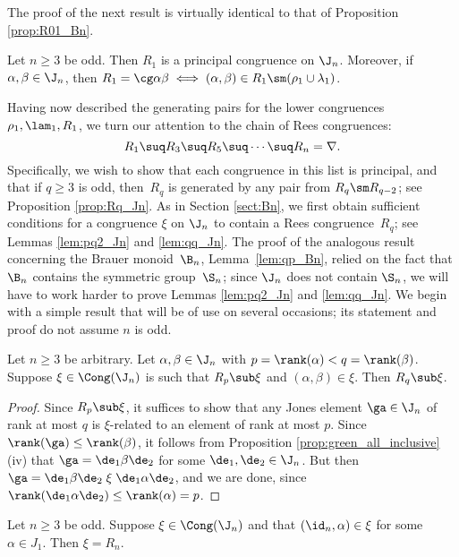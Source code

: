The proof of the next result is virtually identical to that of Proposition \ref{prop:R01_Bn}.


\begin{proposition}\label{prop:R01_Jn}
Let $n\geq3$ be odd.  Then $R_1$ is a principal congruence on $\J_n$.  Moreover, if $\alpha,\beta\in\J_n$, then $R_1=\cg\alpha\beta\iff(\alpha,\beta)\in R_1\sm(\rho_1\cup\lambda_1)$.  \epfres
\end{proposition}




Having now described the generating pairs for the lower congruences $\rho_1,\lam_1,R_1$, we turn our attention to the chain of Rees congruences:
\[
R_1\suq R_3\suq R_5\suq\cdots\suq R_n=\nabla.
\]
Specifically, we wish to show that each congruence in this list is principal, and that if $q\geq3$ is odd, then~$R_q$ is generated by any pair from $R_q\sm R_{q-2}$; see Proposition \ref{prop:Rq_Jn}.
%
As in Section \ref{sect:Bn}, we first obtain sufficient conditions for a congruence $\xi$ on $\J_n$ to contain a Rees congruence~$R_q$; see Lemmas \ref{lem:pq2_Jn} and \ref{lem:qq_Jn}.
%
The proof of the analogous result concerning the Brauer monoid~$\B_n$, Lemma~\ref{lem:qp_Bn}, relied on the fact that $\B_n$ contains the symmetric group~$\S_n$; since $\J_n$ does not contain $\S_n$, we will have to work harder to prove Lemmas \ref{lem:pq2_Jn} and \ref{lem:qq_Jn}.
%
We begin with a simple result that will be of use on several occasions; its statement and proof do not assume $n$ is odd.



\begin{lemma}\label{lem:pq_Jn}
Let $n\geq3$ be arbitrary.  Let $\alpha,\beta\in\J_n$ with $p=\rank(\alpha)<q=\rank(\beta)$.  Suppose ${\xi\in\Cong(\J_n)}$ is such that $R_p\sub\xi$ and $(\alpha,\beta)\in\xi$.  Then $R_q\sub\xi$.
\end{lemma}

\begin{proof} Since $R_p\sub\xi$, it suffices to show that any Jones element $\ga\in\J_n$ of rank at most $q$ is $\xi$-related to an element of rank at most $p$.  Since $\rank(\ga)\leq\rank(\beta)$, it follows from Proposition \ref{prop:green_all_inclusive}(iv) that $\ga=\de_1\beta\de_2$ for some $\de_1,\de_2\in\J_n$.  But then $\ga=\de_1\beta\de_2 \mathrel\xi \de_1\alpha\de_2$, and we are done, since $\rank(\de_1\alpha\de_2)\leq\rank(\alpha)=p$. \end{proof}


%
\begin{lemma}
\label{lem:1z_Jn}
Let $n\geq3$ be odd.  Suppose $\xi\in\Cong(\J_n)$ and that $(\id_n,\alpha)\in\xi$ for some $\alpha\in J_1$.  Then $\xi=R_n$.
\end{lemma}

